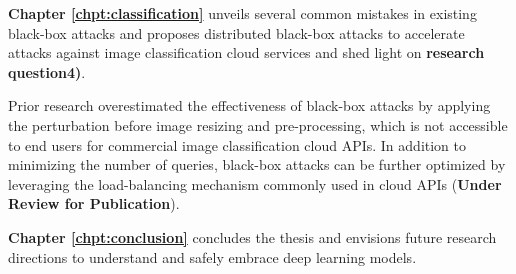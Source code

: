 \vspace{0.5cm}

\noindent \textbf{Chapter \ref{chpt:classification}} unveils several common mistakes in existing black-box attacks and proposes distributed black-box attacks to accelerate attacks against image classification cloud services and shed light on \textbf{research question4)}. 

Prior research overestimated the effectiveness of black-box attacks by applying the perturbation before image resizing and pre-processing, which is not accessible to end users for commercial image classification cloud APIs. In addition to minimizing the number of queries, black-box attacks can be further optimized by leveraging the load-balancing mechanism commonly used in cloud APIs (\textbf{Under Review for Publication}).

\vspace{0.5cm}

\noindent \textbf{Chapter \ref{chpt:conclusion}} concludes the thesis and envisions future research directions to understand and safely embrace deep learning models. 
